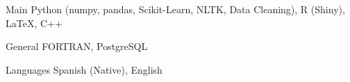 

\begin{cvskills}


  \cvskill
    {Main} %
    {Python (numpy, pandas, Scikit-Learn, NLTK, Data Cleaning), R (Shiny), \LaTeX, C++}
  
 \cvskill
    {General} %
    {FORTRAN, PostgreSQL} %

  \cvskill
    {Languages} %
    {Spanish (Native), English} %

\end{cvskills}
